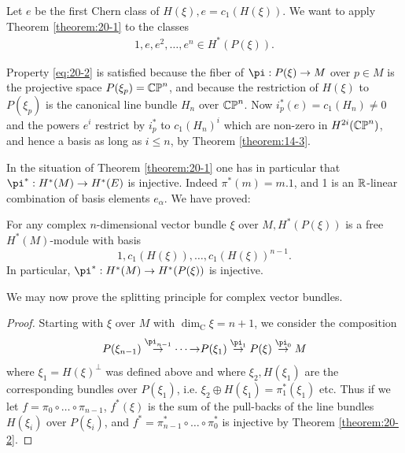 Let $e$ be the first Chern class of $H( \xi ),e = {c}_{1}( {H( \xi ) })$. We want to apply Theorem \ref{theorem:20-1} 
to the classes
\begin{align}\label{eq:20-5}
  1,e,{e}^{2},\ldots,{e}^{n} \in  H^*( {P( \xi ) }).
\end{align}

Property \eqref{eq:20-2} is satisfied because the fiber of $\pi: P( \xi )  \ra  M$ over $p \in  M$ is the projective 
space $P( {\xi_p})  = {\mathbb{CP}^n}$, and because the restriction of $H( \xi )$ to $P( {\xi_p})$ is the canonical 
line bundle $H_{n}$ over ${\mathbb{CP}^n}$. Now ${i}_{p}^*( e)  = {c}_{1}( H_{n})  \neq  0$ and the powers ${e}^{i}$ 
restrict by ${i}_{p}^*$ to ${c}_{1}{( H_{n}) }^{i}$ which are non-zero in $H^{2i}( {\mathbb{CP}^n})$, and hence a basis
as long as $i \leq  n$, by Theorem \ref{theorem:14-3}.

In the situation of Theorem \ref{theorem:20-1} one has in particular that ${\pi }^* : H^*( M)  \ra  H^*( E)$ is injective. 
Indeed ${\pi }^*( m)  = {m.1}$, and 1 is an $\mathbb{R}$-linear combination of basis elements ${e}_{\alpha }$. 
We have proved:

\begin{theorem}\label{theorem:20-2}
  For any complex $n$-dimensional vector bundle $\xi$ over $M,H^*( {P( \xi ) })$ is a free $H^*(M)$-module with basis
  \[
    1,{c}_{1}( {H( \xi ) }),\ldots,{c}_{1}{( H( \xi ) ) }^{n- 1}.
  \]
  In particular, ${\pi }^* : H^*( M)  \ra  H^*( {P( \xi ) })$ is injective.
\end{theorem}

We may now prove the splitting principle for complex vector bundles.

\begingroup
\def\proofname{\textup{\bfseries Proof of Theorem \ref{theorem:18-10}}} 
\begin{proof}
  Starting with $\xi$ over $M$ with ${\dim }_{\mathrm{C}}\xi  = n + 1$, we consider the composition
  \[
    P( {\xi }_{n- 1}) \overset{{\pi }_{n- 1}}
    { \ra } \cdots  
    { \ra }  P( {\xi }_{1}) \overset{{\pi }_{1}}
    { \ra  }P( \xi ) \overset{{\pi }_{0}}
    { \ra  }M
  \]
  where ${\xi }_{1} = H{( \xi ) }^{ \bot  }$ was defined above and where ${\xi }_{2},H( {\xi }_{1})$ are 
  the corresponding bundles over $P( {\xi }_{1})$, i.e. ${\xi }_{2} \oplus  H( {\xi }_{1})  = {\pi }_{1}^*( {\xi }_{1})$ 
  etc. Thus if we let $f = {\pi }_{0} \circ  \ldots  \circ  {\pi }_{n- 1}$, ${f}^*( \xi )$ is the sum of 
  the pull-backs of the line bundles $H( {\xi }_{i})$ over $P( {\xi }_{i})$, and ${f}^* = {\pi }_{n- 1}^* \circ  \ldots  \circ  {\pi }_{0}^*$ 
  is injective by Theorem \ref{theorem:20-2}.
\end{proof}
\endgroup

